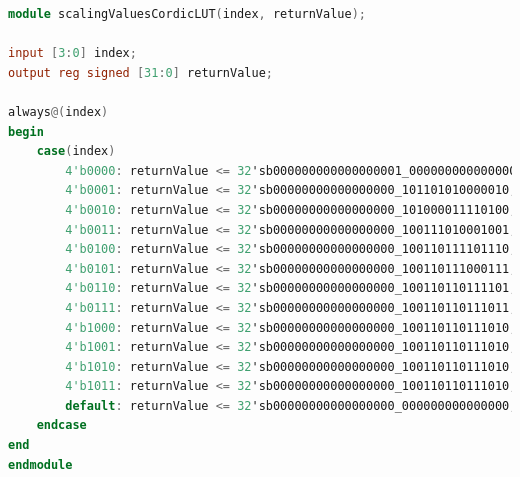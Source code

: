 \documentclass[a4paper, twoside, 11pt]{article}
\newcommand{\fbar}{\FloatBarrier}
\begin{document}
            \begin{lstlisting}[language={verilog}, caption={Verilog code of the scalingValuesCordicLUT lookup table (\gls{abbreviation:lut}) implementation.}, label= {lst:scalingValuesCordicLUT}]
module scalingValuesCordicLUT(index, returnValue);

input [3:0] index;
output reg signed [31:0] returnValue;

always@(index)
begin
    case(index)
        4'b0000: returnValue <= 32'sb000000000000000001_000000000000000; // 1
        4'b0001: returnValue <= 32'sb00000000000000000_101101010000010; // 0.7071067811865476
        4'b0010: returnValue <= 32'sb00000000000000000_101000011110100; // 0.6324555320336759
        4'b0011: returnValue <= 32'sb00000000000000000_100111010001001; // 0.6135719910778964
        4'b0100: returnValue <= 32'sb00000000000000000_100110111101110; // 0.6088339125177524
        4'b0101: returnValue <= 32'sb00000000000000000_100110111000111; // 0.6088339125177524
        4'b0110: returnValue <= 32'sb00000000000000000_100110110111101; // 0.607351770141296
        4'b0111: returnValue <= 32'sb00000000000000000_100110110111011; // 0.6072776440935261
        4'b1000: returnValue <= 32'sb00000000000000000_100110110111010; // 0.6072591122988928
        4'b1001: returnValue <= 32'sb00000000000000000_100110110111010; // 0.6072544793325625
        4'b1010: returnValue <= 32'sb00000000000000000_100110110111010; // 0.6072533210898753
        4'b1011: returnValue <= 32'sb00000000000000000_100110110111010; // 0.6072530315291345
        default: returnValue <= 32'sb00000000000000000_000000000000000; // 0
    endcase
end
endmodule\end{lstlisting}
        \fbar
\end{document}
